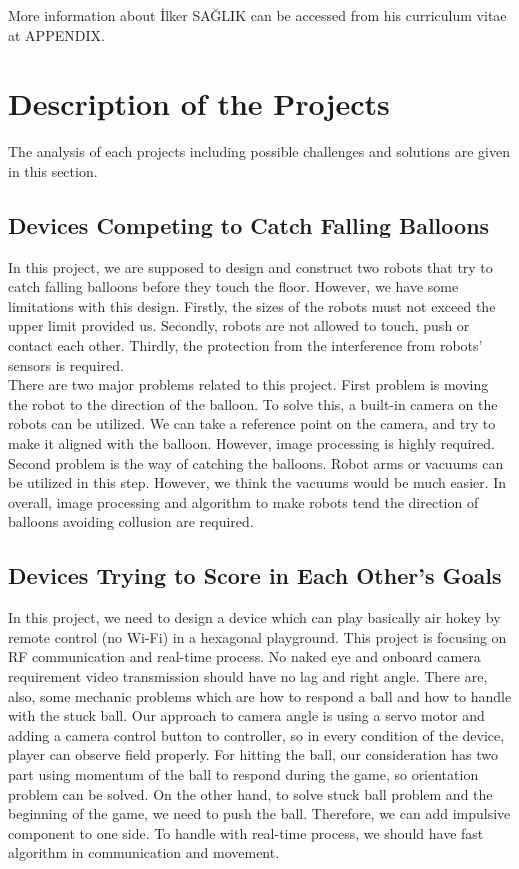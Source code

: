 \documentclass[a4paper,12pt]{article}
\begin{document}
More information about İlker SAĞLIK can be accessed from his curriculum vitae at APPENDIX.\\[0.4cm]


\section{Description of the Projects}
The analysis of each projects including possible challenges and solutions are given in this section.

\subsection{Devices Competing to Catch Falling Balloons}

In this project, we are supposed to design and construct two robots that try to catch falling balloons before they touch the floor. However, we have some limitations with this design. Firstly, the sizes of the robots must not exceed the upper limit provided us. Secondly, robots are not allowed to touch, push or contact each other. Thirdly, the protection from the interference from robots’ sensors is required.\\

There are two major problems related to this project. First problem is moving the robot to the direction of the balloon. To solve this, a built-in camera on the robots can be utilized. We can take a reference point on the camera, and try to make it aligned with the balloon. However, image processing is highly required. Second problem is the way of catching the balloons. Robot arms or vacuums can be utilized in this step. However, we think the vacuums would be much easier. In overall, image processing and algorithm to make robots tend the direction of balloons avoiding collusion are required.

\subsection{Devices Trying to Score in Each Other’s Goals}
In this project, we need to design a device which can play basically air hokey by remote control (no Wi-Fi) in a hexagonal playground. This project is focusing on RF communication and real-time process. No naked eye and onboard camera requirement video transmission should have no lag and right angle. There are, also, some mechanic problems which are how to respond a ball and how to handle with the stuck ball. Our approach to camera angle is using a servo motor and adding a camera control button to controller, so in every condition of the device, player can observe field properly. For hitting the ball, our consideration has two part using momentum of the ball to respond during the game, so orientation problem can be solved. On the other hand, to solve stuck ball problem and the beginning of the game, we need to push the ball. Therefore, we can add impulsive component to one side. To handle with real-time process, we should have fast algorithm in communication and movement. 
\end{document}
